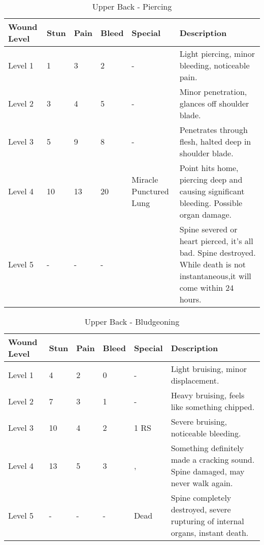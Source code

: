 \documentclass[oneside,11pt,english]{book}
\begin{document}
\begin{table}[!hb] %
	\caption{Upper Back - Piercing}
	\label{wound:Upper Back - Piercing}
	\begin{tabu} to 
		Wound Level &Stun &Pain &Bleed &Special &Description\\\toprule
		Level 1& 1& 3& 2& - &Light piercing, minor bleeding, noticeable pain.\\
		Level 2& 3& 4& 5& - &Minor penetration, glances off shoulder blade. \\
		Level 3& 5& 9& 8& - &Penetrates through flesh, halted deep in shoulder blade. \\
		Level 4& 10& 13& 20& Miracle  Punctured Lung &Point hits home, piercing deep and causing significant bleeding. Possible organ damage.\\ %
		Level 5& - &- &- && Spine severed or heart pierced, it’s all bad. Spine destroyed. While death is not instantaneous,it will come within 24 hours.\\
	\end{tabu}
\end{table}

\begin{table}[!hb] %
	\caption{Upper Back - Bludgeoning}
	\label{wound:Upper Back - Bludgeoning}
	\begin{tabu} to 
Wound Level &Stun &Pain &Bleed &Special &Description\\\toprule
Level 1& 4& 2& 0& - &Light bruising, minor displacement.\\
Level 2& 7& 3& 1& - &Heavy bruising, feels like something chipped.\\
Level 3& 10& 4& 2&  1 RS &Severe bruising, noticeable bleeding.\\
Level 4& 13& 5& 3
	&, 
	&Something definitely made a cracking sound. Spine damaged, may never walk again.\\
Level 5& - &- &- &Dead& Spine completely destroyed, severe rupturing of internal organs, instant death.\\
	\end{tabu}
\end{table}
\end{document}
